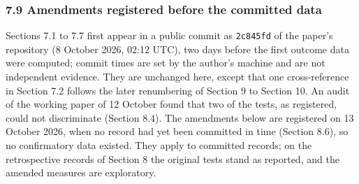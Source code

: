 \subsubsection{7.9 Amendments registered before the committed data}\label{amendments-registered-before-the-committed-data}

Sections 7.1 to 7.7 first appear in a public commit as \texttt{2c845fd} of the paper's repository (8 October 2026, 02:12 UTC), two days before the first outcome data were computed; commit times are set by the author's machine and are not independent evidence. They are unchanged here, except that one cross-reference in Section 7.2 follows the later renumbering of Section 9 to Section 10. An audit of the working paper of 12 October found that two of the tests, as registered, could not discriminate (Section 8.4). The amendments below are registered on 13 October 2026, when no record had yet been committed in time (Section 8.6), so no confirmatory data existed. They apply to committed records; on the retrospective records of Section 8 the original tests stand as reported, and the amended measures are exploratory.


